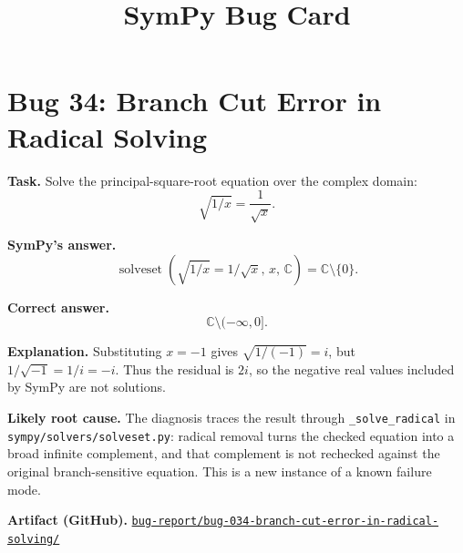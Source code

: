 \documentclass[11pt]{article}
\title{SymPy Bug Card}
\author{}
\date{}
\newcommand{\SymPy}{SymPy}
\newcommand{\artifactrepo}{https://github.com/TODO-org/TODO-repo}
\newcommand{\bugbundle}[1]{\href{\artifactrepo/tree/main/bug-report/#1}{\nolinkurl{bug-report/#1/}}}
\begin{document}
\maketitle

\section*{Bug 34: Branch Cut Error in Radical Solving}

\begin{counterexamplebox}
\textbf{Task.} Solve the principal-square-root equation over the complex domain:
\[
    \sqrt{1/x} = \frac{1}{\sqrt{x}}.
\]

\medskip
\textbf{SymPy's answer.}
\[
    \operatorname{solveset}\!\left(\sqrt{1/x}=1/\sqrt{x},\,x,\,\mathbb{C}\right)
    = \mathbb{C}\setminus\{0\}.
\]

\medskip
\textbf{Correct answer.}
\[
    \mathbb{C}\setminus(-\infty,0].
\]

\medskip
\textbf{Explanation.} Substituting \(x=-1\) gives
\(\sqrt{1/(-1)}=i\), but \(1/\sqrt{-1}=1/i=-i\). Thus the residual is \(2i\), so the negative real values included by \SymPy{} are not solutions.

\medskip
\textbf{Likely root cause.} The diagnosis traces the result through \texttt{\_solve\_radical} in \nolinkurl{sympy/solvers/solveset.py}: radical removal turns the checked equation into a broad infinite complement, and that complement is not rechecked against the original branch-sensitive equation. This is a new instance of a known failure mode.

\medskip
\textbf{Artifact (GitHub).} \bugbundle{bug-034-branch-cut-error-in-radical-solving}
\end{counterexamplebox}
\end{document}
